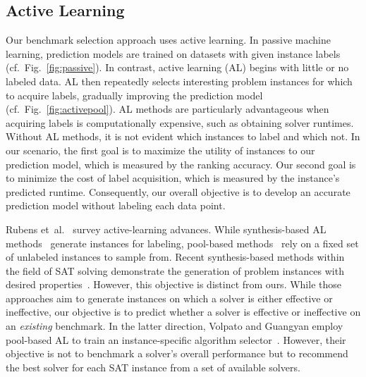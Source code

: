 \documentclass[sn-basic, Numbered]{sn-jnl} %
\begin{document}
\subsection{Active Learning}
\label{sec:related:active-learning}

Our benchmark selection approach uses active learning.
In passive machine learning, prediction models are trained on datasets with given instance labels (cf.~Fig.~\ref{fig:passive}).
In contrast, active learning (AL) begins with little or no labeled data.
AL then repeatedly selects interesting problem instances for which to acquire labels, gradually improving the prediction model (cf.~Fig.~\ref{fig:activepool}).
AL methods are particularly advantageous when acquiring labels is computationally expensive, such as obtaining solver runtimes.
Without AL methods, it is not evident which instances to label and which not.
In our scenario, the first goal is to maximize the utility of instances to our prediction model, which is measured by the ranking accuracy.
Our second goal is to minimize the cost of label acquisition, which is measured by the instance's predicted runtime.
Consequently, our overall objective is to develop an accurate prediction model without labeling each data point.

Rubens et~al.~\cite{RubensESK15} survey active-learning advances.
While synthesis-based AL methods~\cite{0001AEMN22,GarzonMG22,2019gaal} generate instances for labeling, pool-based methods~\cite{GolbandiKL11,HarpaleY08,KorenBV09} rely on a fixed set of unlabeled instances to sample from.
Recent synthesis-based methods within the field of SAT solving demonstrate the generation of problem instances with desired properties~\cite{0001AEMN22,GarzonMG22}.
However, this objective is distinct from ours.
While those approaches aim to generate instances on which a solver is either effective or ineffective, our objective is to predict whether a solver is effective or ineffective on an \emph{existing} benchmark.
In the latter direction, Volpato and Guangyan employ pool-based AL to train an instance-specific algorithm selector~\cite{volpato2019active}.
However, their objective is not to benchmark a solver's overall performance but to recommend the best solver for each SAT instance from a set of available solvers.
\end{document}
